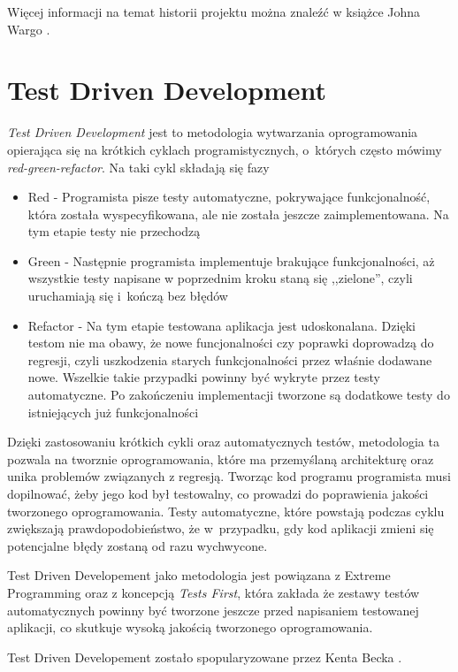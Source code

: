 \documentclass[brudnopis]{xmgr}
\begin{document}
Więcej informacji na temat historii projektu można znaleźć w książce Johna Wargo \cite{Wargo}. 

\section{Test Driven Development}

\textit{Test Driven Development} jest to metodologia wytwarzania oprogramowania opierająca się na krótkich cyklach programistycznych, o~których często mówimy \textit{red-green-refactor}. Na taki cykl składają się fazy
\begin{itemize}
  \item Red - Programista pisze testy automatyczne, pokrywające funkcjonalność, która została wyspecyfikowana, ale nie została jeszcze zaimplementowana. Na tym etapie testy nie przechodzą
  \item Green - Następnie programista implementuje brakujące funkcjonalności, aż wszystkie testy napisane w poprzednim kroku staną się ,,zielone'', czyli uruchamiają się i~kończą bez błędów
  \item Refactor - Na tym etapie testowana aplikacja jest udoskonalana. Dzięki testom nie ma obawy, że nowe funcjonalności czy poprawki doprowadzą do regresji, czyli uszkodzenia starych funkcjonalności przez właśnie dodawane nowe. Wszelkie takie przypadki powinny być wykryte przez testy automatyczne. Po zakończeniu implementacji tworzone są dodatkowe testy do istniejących już funkcjonalności
\end{itemize}

Dzięki zastosowaniu krótkich cykli oraz automatycznych testów, metodologia ta pozwala na tworznie oprogramowania, które ma przemyślaną architekturę oraz unika problemów związanych z regresją. Tworząc kod  programu programista musi dopilnować, żeby jego kod był testowalny, co prowadzi do poprawienia jakości tworzonego oprogramowania. Testy automatyczne, które powstają podczas cyklu zwiększają prawdopodobieństwo, że w~przypadku, gdy kod aplikacji zmieni się potencjalne błędy zostaną od razu wychwycone. 

Test Driven Developement jako metodologia jest powiązana z Extreme Programming oraz z koncepcją \textit{Tests First}, która zakłada że zestawy testów automatycznych powinny być tworzone jeszcze przed napisaniem testowanej aplikacji, co skutkuje wysoką jakością tworzonego oprogramowania.   

Test Driven Developement zostało spopularyzowane przez Kenta Becka \cite{Beck}.
\end{document}
